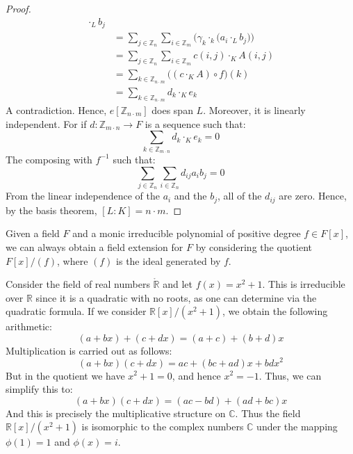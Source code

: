 \documentclass{article}                                                        %
\begin{document}
\begin{proof}
\begin{align}
                    \cdot_{L}b_{j}\\
                &=\sum_{j\in\mathbb{Z}_{n}}\sum_{i\in\mathbb{Z}_{m}}
                    \Big(\gamma_{k}\cdot_{k}\big(a_{i}\cdot_{L}b_{j}\big)\Big)\\
                &=\sum_{j\in\mathbb{Z}_{n}}\sum_{i\in\mathbb{Z}_{m}}
                    c(i,j)\cdot_{K}A(i,j)\\
                &=\sum_{k\in\mathbb{Z}_{n\cdot{m}}}
                    \big((c\cdot_{K}A)\circ{f}\big)(k)\\
                &=\sum_{k\in\mathbb{Z}_{n\cdot{m}}}d_{k}\cdot_{K}e_{k}
            \end{align}
            A contradiction. Hence, $e[\mathbb{Z}_{n\cdot{m}}]$ does span
            $L$. Moreover, it is linearly independent. For if
            $d:\mathbb{Z}_{m\cdot{n}}\rightarrow{F}$ is a sequence such that:
            \begin{equation}
                \sum_{k\in\mathbb{Z}_{m\cdot{n}}}d_{k}\cdot_{K}e_{k}=0
            \end{equation}
            The composing with $f^{\minus{1}}$ such that:
            \begin{equation}
                \sum_{j\in\mathbb{Z}_{n}}\sum_{i\in\mathbb{Z}_{n}}
                    d_{ij}a_{i}b_{j}=0
            \end{equation}
            From the linear independence of the $a_{i}$ and the $b_{j}$,
            all of the $d_{ij}$ are zero. Hence, by the basis theorem,
            $[L:K]=n\cdot{m}$.
        \end{proof}
        Given a field $F$ and a monic irreducible polynomial of positive degree
        $f\in{F}[x]$, we can always obtain a field extension for $F$ by
        considering the quotient $F[x]/(f)$, where $(f)$ is the ideal generated
        by $f$.
        \begin{example}
            Consider the field of real numbers $\ring{\mathbb{R}}$ and let
            $f(x)=x^{2}+1$. This is irreducible over $\mathbb{R}$ since it is
            a quadratic with no roots, as one can determine via the quadratic
            formula. If we consider $\mathbb{R}[x]/(x^{2}+1)$, we obtain the
            following arithmetic:
            \begin{equation}
                (a+bx)+(c+dx)=(a+c)+(b+d)x
            \end{equation}
            Multiplication is carried out as follows:
            \begin{equation}
                (a+bx)(c+dx)=ac+(bc+ad)x+bdx^{2}
            \end{equation}
            But in the quotient we have $x^{2}+1=0$, and hence
            $x^{2}=\minus{1}$. Thus, we can simplify this to:
            \begin{equation}
                (a+bx)(c+dx)=(ac-bd)+(ad+bc)x
            \end{equation}
            And this is precisely the multiplicative structure on $\mathbb{C}$.
            Thus the field $\mathbb{R}[x]/(x^{2}+1)$ is isomorphic to the
            complex numbers $\mathbb{C}$ under the mapping
            $\phi(1)=1$ and $\phi(x)=i$.
        \end{example}
\end{document}
